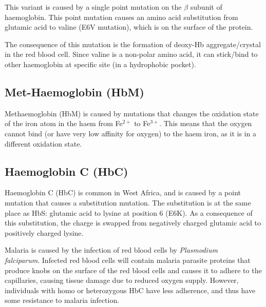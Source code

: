 This variant is caused by a single point mutation on the $\beta$ subunit of haemoglobin.
This point mutation causes an amino acid substitution from glutamic acid to valine (E6V mutation), which is on the surface of the protein.

The consequence of this mutation is the formation of deoxy-Hb aggregate/crystal in the red blood cell.
Since valine is a non-polar amino acid, it can stick/bind to other haemoglobin at specific site (in a hydrophobic pocket).

\begin{center}
\end{center}

\subsection{Met-Haemoglobin (HbM)}

Methaemoglobin (HbM) is caused by mutations that changes the oxidation state of the iron atom in the haem from Fe$^{2+}$ to Fe$^{3+}$.
This means that the oxygen cannot bind (or have very low affinity for oxygen) to the haem iron, as it is in a different oxidation state.

\subsection{Haemoglobin C (HbC)}

Haemoglobin C (HbC) is common in West Africa, and is caused by a point mutation that causes a substitution mutation.
The substitution is at the same place as HbS: glutamic acid to lysine at position 6 (E6K).
As a consequence of this substitution, the charge is swapped from negatively charged glutamic acid to positively charged lysine.

Malaria is caused by the infection of red blood cells by \textit{Plasmodium \\falciparum}.
Infected red blood cells will contain malaria parasite proteins that produce knobs on the surface of the red blood cells and causes it to adhere to the capillaries, causing tissue damage due to reduced oxygen supply.
However, individuals with homo or heterozygous HbC have less adherence, and thus have some resistance to malaria infection.





